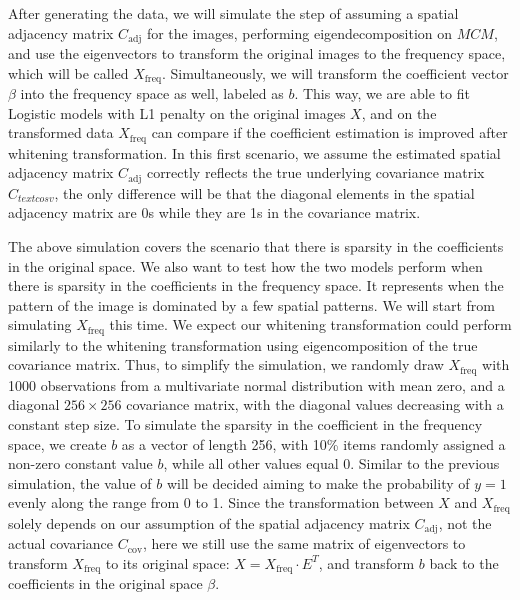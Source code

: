 \documentclass[12pt]{article}
\begin{document}
After generating the data, we will simulate the step of assuming a spatial adjacency matrix \( C_{\text{adj}} \) for the images, performing eigendecomposition on \( M C M \), and use the eigenvectors to transform the original images to the frequency space, which will be called \( X_{\text{freq}} \). Simultaneously, we will transform the coefficient vector \( \beta \) into the frequency space as well, labeled as \( b \). This way, we are able to fit Logistic models with L1 penalty on the original images \( X \), and on the transformed data \( X_{\text{freq}} \) can compare if the coefficient estimation is improved after whitening transformation. In this first scenario, we assume the estimated spatial adjacency matrix \( C_{\text{adj}} \) correctly reflects the true underlying covariance matrix \( C_{text{cosv}} \), the only difference will be that the diagonal elements in the spatial adjacency matrix are 0s while they are 1s in the covariance matrix.

The above simulation covers the scenario that there is sparsity in the coefficients in the original space. We also want to test how the two models perform when there is sparsity in the coefficients in the frequency space. It represents when the pattern of the image is dominated by a few spatial patterns. We will start from simulating \( X_{\text{freq}} \) this time. We expect our whitening transformation could perform similarly to the whitening transformation using eigencomposition of the true covariance matrix. Thus, to simplify the simulation, we randomly draw \( X_{\text{freq}} \) with 1000 observations from a multivariate normal distribution with mean zero, and a diagonal \( 256 \times 256 \) covariance matrix, with the diagonal values decreasing with a constant step size. To simulate the sparsity in the coefficient in the frequency space, we create \( b \) as a vector of length 256, with 10\% items randomly assigned a non-zero constant value \( b \), while all other values equal 0. Similar to the previous simulation, the value of \( b \) will be decided aiming to make the probability of \( y=1 \) evenly along the range from 0 to 1. Since the transformation between \( X \) and \( X_{\text{freq}} \) solely depends on our assumption of the spatial adjacency matrix \( C_{\text{adj}} \), not the actual covariance \( C_{\text{cov}} \), here we still use the same matrix of eigenvectors to transform \( X_{\text{freq}} \) to its original space: \( X = X_{\text{freq}} \cdot E^T \), and transform \( b \) back to the coefficients in the original space \( \beta \).
\end{document}
